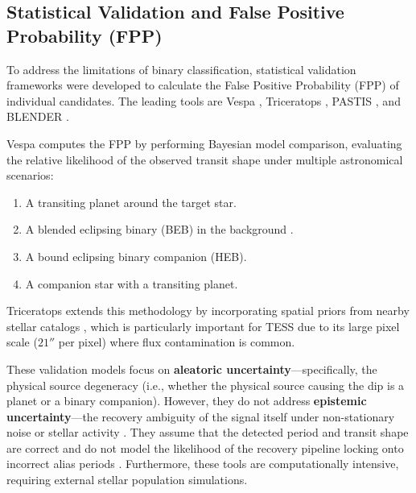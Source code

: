 \subsection{Statistical Validation and False Positive Probability (FPP)} \label{sec:statistical_validation}
To address the limitations of binary classification, statistical validation frameworks were developed to calculate the False Positive Probability (FPP) of individual candidates. The leading tools are Vespa \citep{Morton2012, Morton2015, Morton2016}, Triceratops \citep{Giacalone2021}, PASTIS \citep{Diaz2014, Santerne2015}, and BLENDER \citep{Torres2011}.

Vespa computes the FPP by performing Bayesian model comparison, evaluating the relative likelihood of the observed transit shape under multiple astronomical scenarios:
\begin{enumerate}
\item A transiting planet around the target star.
\item A blended eclipsing binary (BEB) in the background \citep{Santerne2012, Bryson2013, Colon2012}.
\item A bound eclipsing binary companion (HEB).
\item A companion star with a transiting planet.
\end{enumerate}

Triceratops extends this methodology by incorporating spatial priors from nearby stellar catalogs \citep{Stassun2018, Stassun2019}, which is particularly important for TESS \citep{Ricker2015, Sullivan2015} due to its large pixel scale ($21''$ per pixel) where flux contamination is common.

These validation models focus on \textbf{aleatoric uncertainty}---specifically, the physical source degeneracy (i.e., whether the physical source causing the dip is a planet or a binary companion). However, they do not address \textbf{epistemic uncertainty}---the recovery ambiguity of the signal itself under non-stationary noise or stellar activity \citep{Meunier2010, McQuillan2013, McQuillan2014}. They assume that the detected period and transit shape are correct and do not model the likelihood of the recovery pipeline locking onto incorrect alias periods \citep{Dawson2010}. Furthermore, these tools are computationally intensive, requiring external stellar population simulations.

